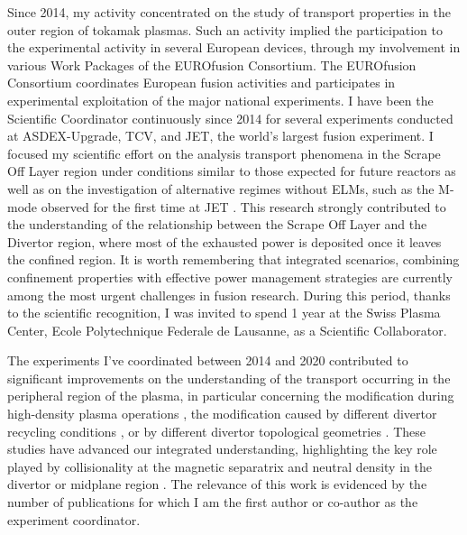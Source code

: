 Since 2014, my activity concentrated on the study of transport
properties in the outer region of tokamak plasmas. Such an activity
implied the participation to the experimental activity in several
European devices,  through my involvement in various Work Packages of
the EUROfusion Consortium. The EUROfusion Consortium coordinates
European fusion activities and participates in experimental
exploitation of the major national experiments. I have been the
Scientific Coordinator continuously since 2014 for several experiments
conducted at ASDEX-Upgrade, TCV, and JET, the world's largest fusion
experiment. I focused my scientific effort on the analysis transport
phenomena in the Scrape Off Layer region under conditions similar to
those expected for future reactors as well as on the investigation of
alternative regimes without ELMs, such as the M-mode observed for the
first time at JET \cite{Solano:2017db, Refy:NuclearFusion2020}. This
research strongly contributed to the understanding of the relationship
between the Scrape Off Layer and the Divertor region, where most of
the exhausted power is deposited once it leaves the confined
region. It is worth remembering that integrated scenarios,  combining
confinement properties with effective power management strategies are
currently among the most urgent challenges in fusion research. During
this period, thanks to the scientific recognition, I was invited to spend 1 year at the Swiss Plasma Center, Ecole Polytechnique Federale de Lausanne, as a Scientific Collaborator.

The experiments I've coordinated  between 2014 and 2020 contributed to 
significant improvements on the understanding of
the transport occurring in the peripheral region of the plasma, in particular concerning the modification
during high-density plasma operations \cite{Stagni:nf2024,
  stagni:nf2022, Carralero:prl2015, Vianello:2017ku,
  vianello:nf2019, Carralero:2017gb, tsui:pop2022},
the modification caused by different divertor recycling conditions \cite{Lomanowski2023, lomanowski:nf2022,
  kevin:nf2019, Reimerdes:2017cp}, or by different divertor topological geometries \cite{Vianello:2017ku, theiler:nf2017}. These studies have advanced our integrated understanding, highlighting the key role played by collisionality at the magnetic separatrix \cite{Stagni:nf2024, vianello2023h, stagni:nf2022, vianello:iaea2021sol} and neutral density in the divertor or midplane region \cite{agostini:ppcf2019, vianello:nf2019}. The relevance of this work is evidenced by the number of publications for which I am the first author or co-author as the experiment coordinator.

